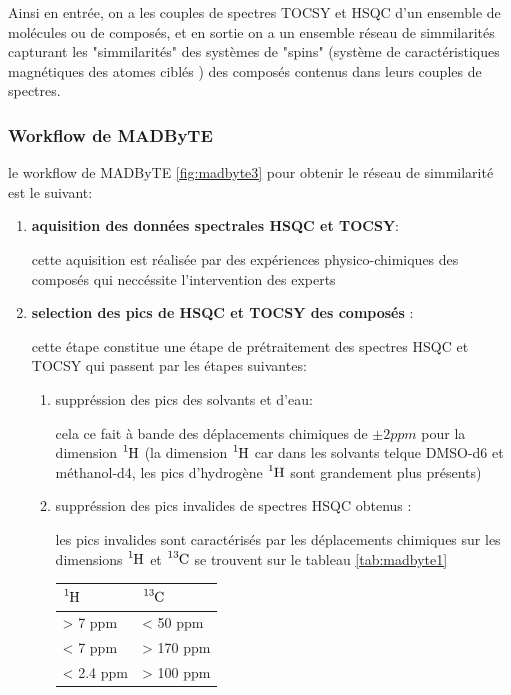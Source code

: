 \documentclass[12pt, french, latin.medieval, a4paper]{report}
\begin{document}
    Ainsi en entrée, on a les couples de spectres TOCSY et HSQC d'un ensemble de molécules ou de composés, et en sortie on a un ensemble réseau de simmilarités capturant les "simmilarités" des systèmes de "spins" (système de caractéristiques magnétiques des atomes ciblés ) des composés contenus dans leurs couples de spectres.

    \subsubsection{Workflow de MADByTE}
    le workflow de MADByTE \ref{fig:madbyte3} pour obtenir le réseau de simmilarité est le suivant:
    \begin{enumerate}
        \item \textbf{aquisition des données spectrales HSQC et TOCSY}: 
        
        cette aquisition est réalisée par des expériences physico-chimiques des composés qui neccéssite l'intervention des experts
        \item \textbf{selection des pics de HSQC et TOCSY des composés} :
        
        cette étape constitue une étape de prétraitement des spectres HSQC et TOCSY qui passent par les étapes suivantes:
        \begin{enumerate}
            \item suppréssion des pics des solvants et d'eau: 
            
            cela ce fait à bande des déplacements chimiques de $\pm2ppm$ pour la dimension $\ce{^{1}_{}H}$ (la dimension $\ce{^{1}_{}H}$ car dans les solvants telque DMSO-d6 et méthanol-d4, les pics d'hydrogène $\ce{^{1}_{}H}$ sont grandement plus présents) 
            
            \item suppréssion des pics invalides de spectres HSQC obtenus : 
            
            les pics invalides sont caractérisés par les déplacements chimiques sur les dimensions $\ce{^{1}_{}H}$ et $\ce{^{13}_{}C}$ se trouvent sur le tableau \ref{tab:madbyte1} 
            \begin{center}
                \begin{tabular}{|C{2cm}|C{1cm}|}
                    \hline $\ce{^{1}_{}H}$  & $\ce{^{13}_{}C}$ \\
                    \hline  > 7 ppm & < 50 ppm\\
                    \hline  < 7 ppm & > 170 ppm\\
                    \hline  < 2.4 ppm & > 100 ppm\\
                    \hline 
                \end{tabular}
                \label{tab:madbyte1}
            \end{center}


\end{enumerate}
\end{enumerate}
\end{document}

